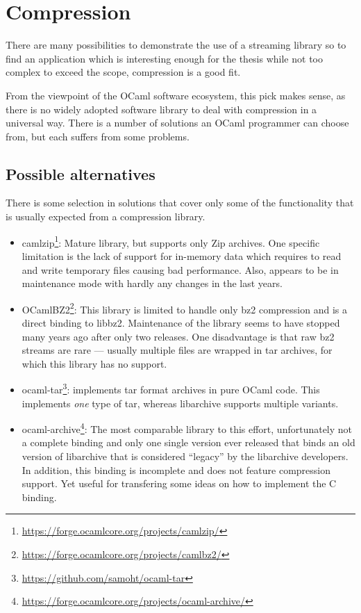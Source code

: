\documentclass[parskip=half]{scrreprt}
\begin{document}
\section{Compression}
\label{sec:compression}

There are many possibilities to demonstrate the use of a streaming library so
to find an application which is interesting enough for the thesis while not too
complex to exceed the scope, compression is a good fit.

From the viewpoint of the OCaml software ecosystem, this pick makes sense, as
there is no widely adopted software library to deal with compression in a
universal way. There is a number of solutions an OCaml programmer can choose
from, but each suffers from some problems.

\subsection{Possible alternatives}
\label{sec:alternatives}

There is some selection in solutions that cover only some of the functionality
that is usually expected from a compression library.

\begin{itemize}
  \item camlzip\footnote{\url{https://forge.ocamlcore.org/projects/camlzip/}}:
    Mature library, but supports only Zip archives. One specific limitation is
    the lack of support for in-memory data which requires to read and write
    temporary files causing bad performance. Also, appears to be in maintenance
    mode with hardly any changes in the last years.
  \item OCamlBZ2\footnote{\url{https://forge.ocamlcore.org/projects/camlbz2/}}:
    This library is limited to handle only bz2 compression and is a direct
    binding to libbz2. Maintenance of the library seems to have stopped many
    years ago after only two releases. One disadvantage is that raw bz2
    streams are rare — usually multiple files are wrapped in tar archives,
    for which this library has no support.
  \item ocaml-tar\footnote{\url{https://github.com/samoht/ocaml-tar}}:
    implements tar format archives in pure OCaml code. This implements
    \emph{one} type of tar, whereas libarchive supports multiple variants.
  \item ocaml-archive\footnote{\url{https://forge.ocamlcore.org/projects/ocaml-archive/}}:
    The most comparable library to this effort, unfortunately not a complete
    binding and only one single version ever released that binds an old version
    of libarchive that is considered \enquote{legacy} by the libarchive
    developers. In addition, this binding is incomplete and does not feature
    compression support. Yet useful for transfering some ideas on how to
    implement the C binding.
\end{itemize}
\end{document}

